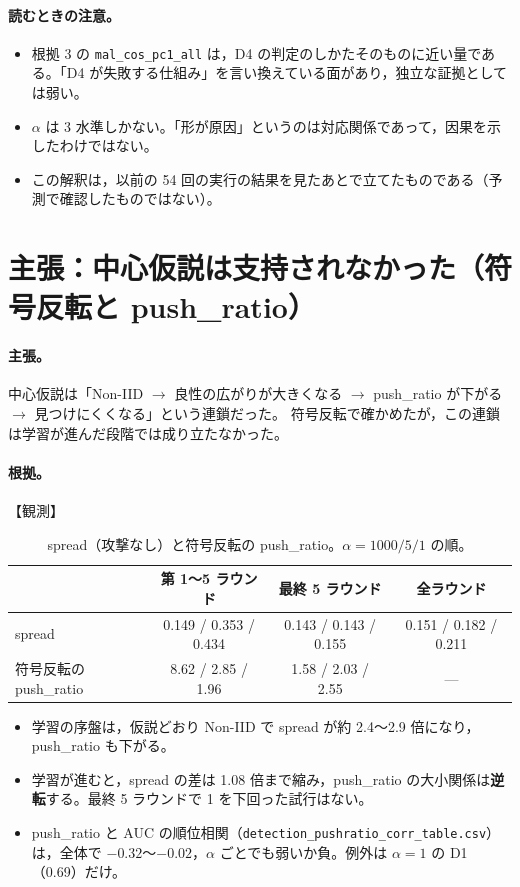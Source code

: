 \documentclass[a4j, dvipdfmx]{jsarticle}  %
\begin{document}
\paragraph{読むときの注意。}
\begin{itemize}
  \item 根拠 3 の \texttt{mal\_cos\_pc1\_all} は，D4 の判定のしかたそのものに近い量である。「D4 が失敗する仕組み」を言い換えている面があり，独立な証拠としては弱い。
  \item $\alpha$ は 3 水準しかない。「形が原因」というのは対応関係であって，因果を示したわけではない。
  \item この解釈は，以前の 54 回の実行の結果を見たあとで立てたものである（予測で確認したものではない）。
\end{itemize}

\section{主張：中心仮説は支持されなかった（符号反転と push\_ratio）}
\label{sec:claim-hyp}

\paragraph{主張。}
中心仮説は「Non-IID $\to$ 良性の広がりが大きくなる $\to$ push\_ratio が下がる $\to$ 見つけにくくなる」という連鎖だった。
符号反転で確かめたが，この連鎖は学習が進んだ段階では成り立たなかった。

\paragraph{根拠。}【観測】
\begin{table}[H]
\centering
\caption{spread（攻撃なし）と符号反転の push\_ratio。$\alpha = 1000 / 5 / 1$ の順。}
\begin{tabular}{@{}lccc@{}}
\toprule
 & 第 1〜5 ラウンド & 最終 5 ラウンド & 全ラウンド \\
\midrule
spread & 0.149 / 0.353 / 0.434 & 0.143 / 0.143 / 0.155 & 0.151 / 0.182 / 0.211 \\
符号反転の push\_ratio & 8.62 / 2.85 / 1.96 & 1.58 / 2.03 / 2.55 & --- \\
\bottomrule
\end{tabular}
\end{table}
\begin{itemize}
  \item 学習の序盤は，仮説どおり Non-IID で spread が約 2.4〜2.9 倍になり，push\_ratio も下がる。
  \item 学習が進むと，spread の差は 1.08 倍まで縮み，push\_ratio の大小関係は\textbf{逆転}する。最終 5 ラウンドで 1 を下回った試行はない。
  \item push\_ratio と AUC の順位相関（\texttt{detection\_pushratio\_corr\_table.csv}）は，全体で $-0.32$〜$-0.02$，$\alpha$ ごとでも弱いか負。例外は $\alpha = 1$ の D1（0.69）だけ。
\end{itemize}
\end{document}
